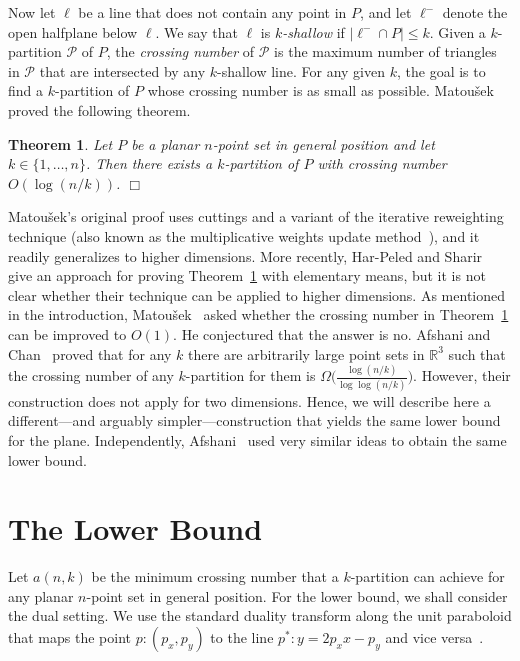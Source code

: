 \documentclass{paper}
\newcommand\R{{\mathbb R}}
\newcommand\matousek{{Matou{\v{s}}ek}}
\newtheorem {theorem} {Theorem}[section]
\begin{document}
Now let  $\ell$  be a line that does not contain any point in $P$, and let
$\ell^-$ denote the open halfplane below $\ell$. 
We say that $\ell$ is \emph{$k$-shallow} if 
$|\ell^- \cap P| \leq k$. Given a $k$-partition $\mathcal{P}$
of $P$, the \emph{crossing number} of $\mathcal{P}$ is the 
maximum number of triangles in $\mathcal{P}$ that are intersected
by any $k$-shallow line. For any given $k$, the goal is to find 
a $k$-partition of $P$ whose crossing number is as small as possible.
\matousek~\cite[Theorem~3.1]{Matousek92} 
proved the following theorem.
\begin{theorem} 
\label{thm:shallowpart}
Let $P$ be a planar $n$-point set in general position and let 
$k \in \{1, \ldots,
n\}$. Then there exists a $k$-partition of $P$ with crossing number
$O(\log(n/k))$. \hfill$\Box$
\end{theorem}

\matousek's original proof uses cuttings and a variant of the 
iterative reweighting technique (also known as the multiplicative weights 
update method~\cite{AroraHaKa10}), and it readily generalizes to higher 
dimensions. 
More recently, Har-Peled and Sharir~\cite[Lemma~3.3]{HarPeledSh11} give
an approach for proving Theorem~\ref{thm:shallowpart} with elementary 
means, but it is not clear whether their technique can be applied to 
higher dimensions. As mentioned in the introduction, 
\matousek~\cite{Matousek92} 
asked whether
the crossing number in Theorem~\ref{thm:shallowpart} can be
improved to $O(1)$. He conjectured that the answer is no. 
Afshani and Chan~\cite{AfshaniCh09} proved that for any $k$ there are
arbitrarily large point sets
in $\R^3$ such that the crossing number
of any $k$-partition for them is 
$\Omega\bigl(\frac{\log (n/k)}{\log\log (n/k)}\bigr)$. 
However, their construction
does not apply for two dimensions. 
Hence, we will describe here a different---and arguably simpler---construction
that yields the same lower bound for the plane.
Independently, Afshani~\cite{Afshani10} used very similar ideas to
obtain the same lower bound.

\section{The Lower Bound}

Let $a(n,k)$ be the minimum crossing number that
a $k$-partition can achieve for any planar $n$-point set
in general position. 
For the lower bound, we shall consider the dual setting. 
We use the standard duality 
transform along the unit paraboloid that maps the point 
$p:(p_x,p_y)$ to the line $p^*: y = 2p_x x -p_y$ and vice
versa~\cite{Mulmuley94}.
\end{document}
